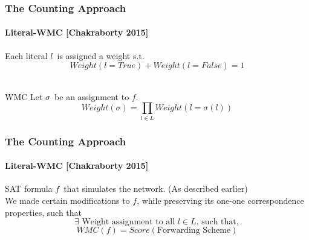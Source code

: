 \documentclass{beamer}
\begin{document}
\begin{frame}
\frametitle{The Counting Approach} %
\framesubtitle{Literal-WMC [Chakraborty 2015]}

	Each literal $l$\ is assigned a weight s.t.\\
	\vspace*{-5pt}
	$$Weight(l=True) + Weight(l=False) = 1$$\\
	\begin{block}{WMC}
	Let $\sigma$\ be an assignment to $ f $.
		$$Weight(\sigma) = \prod_{l \in L}{Weight(l=\sigma(l))}$$
	\end{block}
\end{frame}

\begin{frame}
\frametitle{The Counting Approach}
\framesubtitle{Literal-WMC [Chakraborty 2015]}
	SAT formula $ f $\ that simulates the network. (As described earlier)\\[1ex]
	We made certain modifications to $f$, while preserving its one-one correspondence properties, such that
	$$\exists \text{ Weight assignment to all $l \in L$, such that},$$
	$$WMC(f) = Score(\text{Forwarding Scheme})$$
\end{frame}
\end{document}
